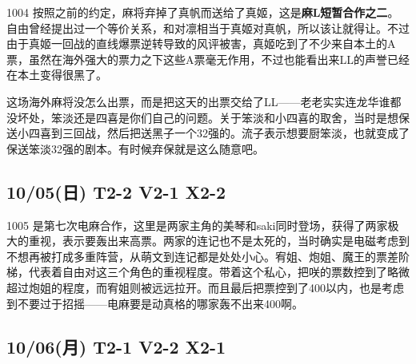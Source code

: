 1004 按照之前的约定，麻将弃掉了真帆而送给了真姬，这是\textbf{麻L短暂合作之二}。自由曾经提出过一个等价关系，和对凛相当于真姬对真帆，所以该让就得让。不过由于真姬一回战的直线爆票逆转导致的风评被害，真姬吃到了不少来自本土的A票，虽然在海外强大的票力之下这些A票毫无作用，不过也能看出来LL的声誉已经在本土变得很黑了。

这场海外麻将没怎么出票，而是把这天的出票交给了LL——老老实实连龙华谁都没坏处，笨淡还是四喜是你们自己的问题。关于笨淡和小四喜的取舍，当时是想保送小四喜到三回战，然后把送黑子一个32强的。流子表示想要厨笨淡，也就变成了保送笨淡32强的剧本。有时候弃保就是这么随意吧。

\subsection{10/05(日) T2-2 V2-1 X2-2}


1005 是第七次电麻合作，这里是两家主角的美琴和saki同时登场，获得了两家极大的重视，表示要轰出来高票。两家的连记也不是太死的，当时确实是电磁考虑到不想再被打成多重阵营，从萌文到连记都是处处小心。宥姐、炮姐、魔王的票差阶梯，代表着自由对这三个角色的重视程度。带着这个私心，把咲的票数控到了略微超过炮姐的程度，而宥姐则被远远拉开。而且最后把票控到了400以内，也是考虑到不要过于招摇——电麻要是动真格的哪家轰不出来400啊。

\subsection{10/06(月) T2-1 V2-2 X2-1}

